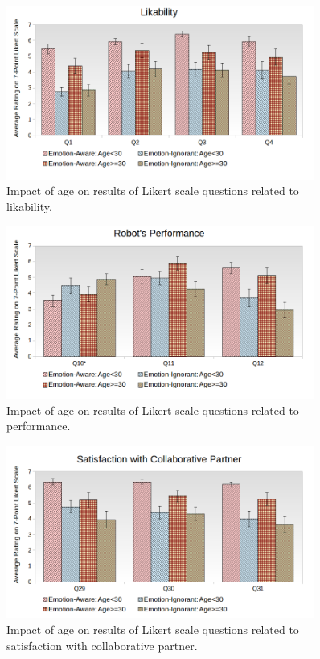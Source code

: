 \documentclass[12pt]{report}
\begin{document}
\begin{figure}[tbh]
\centering
\includegraphics[width=0.9\textwidth]{figure/Age-Likability.png}
\caption{Impact of age on results of Likert scale questions related to
likability.}
\label{fig:age-likability}
\end{figure}

\begin{figure}[tbh]
\centering
\includegraphics[width=0.9\textwidth]{figure/Age-Performance.png}
\caption{Impact of age on results of Likert scale questions related to
performance.}
\label{fig:age-performance}
\end{figure}

\begin{figure}[tbh]
\centering
\includegraphics[width=0.9\textwidth]{figure/Age-Satisfaction.png}
\caption{Impact of age on results of Likert scale questions related to
satisfaction with collaborative partner.}
\label{fig:age-satisfaction}
\end{figure}
\end{document}
